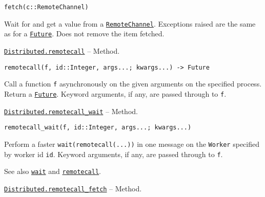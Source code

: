 \begin{adjustwidth}{2em}{0pt}


\begin{verbatim}
fetch(c::RemoteChannel)
\end{verbatim}

Wait for and get a value from a \hyperlink{16773267780467157552}{\texttt{RemoteChannel}}. Exceptions raised are the same as for a \hyperlink{4170271048165085864}{\texttt{Future}}. Does not remove the item fetched.



\end{adjustwidth}
\hypertarget{16286103980815121272}{} 
\hyperlink{16286103980815121272}{\texttt{Distributed.remotecall}}  -- {Method.}

\begin{adjustwidth}{2em}{0pt}


\begin{verbatim}
remotecall(f, id::Integer, args...; kwargs...) -> Future
\end{verbatim}

Call a function \texttt{f} asynchronously on the given arguments on the specified process. Return a \hyperlink{4170271048165085864}{\texttt{Future}}. Keyword arguments, if any, are passed through to \texttt{f}.



\end{adjustwidth}
\hypertarget{14331709651005681807}{} 
\hyperlink{14331709651005681807}{\texttt{Distributed.remotecall\_wait}}  -- {Method.}

\begin{adjustwidth}{2em}{0pt}


\begin{verbatim}
remotecall_wait(f, id::Integer, args...; kwargs...)
\end{verbatim}

Perform a faster \texttt{wait(remotecall(...))} in one message on the \texttt{Worker} specified by worker id \texttt{id}. Keyword arguments, if any, are passed through to \texttt{f}.

See also \hyperlink{13761789780433862250}{\texttt{wait}} and \hyperlink{16286103980815121272}{\texttt{remotecall}}.



\end{adjustwidth}
\hypertarget{14909184572421937971}{} 
\hyperlink{14909184572421937971}{\texttt{Distributed.remotecall\_fetch}}  -- {Method.}

